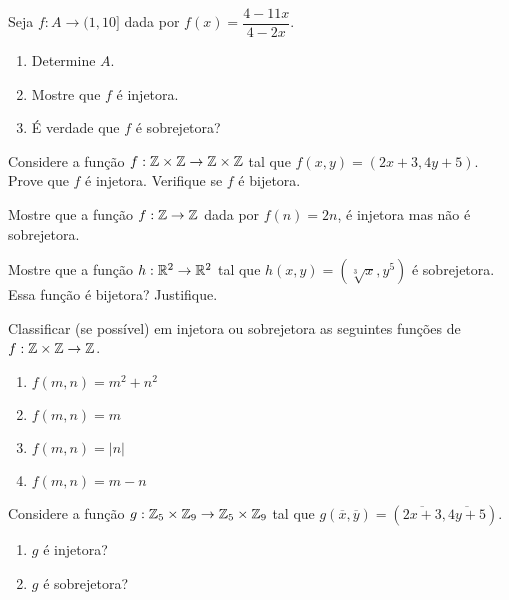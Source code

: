 \documentclass[12pt]{exam}
\begin{document}
\questao{} Seja $f : A \to (1,10]$ dada por $f(x) = \dfrac{4 - 11x}{4 - 2x}$.
\begin{enumerate}[label={\alph*})]
    \item Determine $A$.

    \item Mostre que $f$ é injetora.

    \item É verdade que $f$ é sobrejetora?
\end{enumerate}

\vspace{.3cm}

\questao{} Considere a função $f : \mathbb{Z} \times \mathbb{Z} \to \mathbb{Z} \times \mathbb{Z}$ tal que $f(x,y) = (2x + 3, 4y + 5)$. Prove que $f$ é injetora. Verifique se $f$ é bijetora.

\vspace{.3cm}

\questao{} Mostre que a função $f : \mathbb{Z} \to \mathbb{Z}$ dada por $f(n) = 2n$, é injetora mas não é sobrejetora.

\vspace{.3cm}

\questao{} Mostre que a função $h : \mathbb{R}^2 \to \mathbb{R}^2$ tal que $h(x, y) = (\sqrt[3]{x}, y^5)$ é sobrejetora. Essa função é bijetora? Justifique.

\vspace{.3cm}

\questao{} Classificar (se possível) em injetora ou sobrejetora as seguintes funções de $f : \mathbb{Z} \times \mathbb{Z} \to \mathbb{Z}$.

\begin{multicols}{2}
    \begin{enumerate}[label={\alph*})]
        \item $f(m, n) = m^2 + n^2$

        \item $f(m, n) = m$

        \item $f(m, n) = |n|$

        \item $f(m, n) = m - n$
    \end{enumerate}
\end{multicols}

\vspace{.3cm}

\questao{} Considere a função $g : \mathbb{Z}_5 \times \mathbb{Z}_9 \to \mathbb{Z}_5 \times \mathbb{Z}_9$ tal que $g(\overline{x},\overline{y}) = (\overline{2x + 3}, \overline{4y + 5})$.
\begin{enumerate}[label={\alph*})]
    \item $g$ é injetora?

    \item $g$ é sobrejetora?
\end{enumerate}
\end{document}
